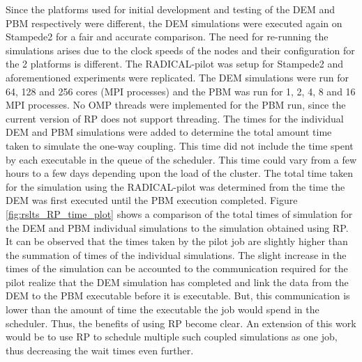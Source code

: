 \documentclass[preprint,11pt,authoryear]{elsarticle}
\begin{document}
 Since the platforms used for initial development and testing of the DEM and PBM respectively were different, 
the DEM simulations were executed again on Stampede2 for a fair and accurate comparison. The need for re-running
the simulations arises due to the clock speeds of the nodes and their configuration for the 2 platforms is different.
The RADICAL-pilot was setup for Stampede2 and aforementioned experiments were replicated. The DEM simulations were 
run for 64, 128 and 256 cores (MPI processes) and the PBM was run for 1, 2, 4, 8 and 16 MPI processes. No OMP threads 
were implemented for the PBM run, since the current version of RP does not support threading. 
 The times for the individual DEM and PBM simulations were added to determine the total amount time taken to 
simulate the one-way coupling. This time did not include the time spent by each executable in the queue of the 
scheduler. This time could vary from a few hours to a few days depending upon the load of the cluster. The total 
time taken for the simulation using the RADICAL-pilot was determined from the time the DEM was first executed until 
the PBM execution completed. Figure \ref{fig:rslts_RP_time_plot} shows a comparison of the total times of simulation 
for the DEM and PBM individual simulations to the simulation obtained using RP. It can be observed that the times taken 
by the pilot job are slightly higher than the summation of times of the individual simulations. The slight increase in 
the times of the simulation can be accounted to the communication required for the pilot realize that the DEM simulation 
has completed and link the data from the DEM to the PBM executable before it is executable. But, this communication is 
lower than the amount of time the executable the job would spend in the scheduler. Thus, the benefits of using RP become 
clear. An extension of this work would be to use RP to schedule multiple such coupled simulations as one job, thus 
decreasing the wait times even further. 
\end{document}
